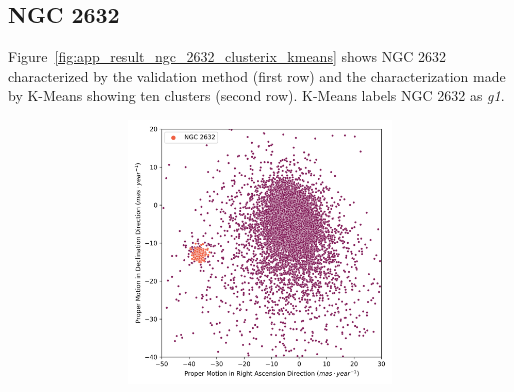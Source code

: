 \documentclass[11pt,a4paper,english,twocolumn]{article}
\begin{document}
\subsection{NGC 2632}
\label{sec:ngc2632}

Figure~\ref{fig:app_result_ngc_2632_clusterix_kmeans} shows NGC 2632 characterized
by the validation method (first row) and the characterization made by K-Means
showing ten clusters (second row). K-Means labels NGC 2632 as \emph{g1}.

\begin{figure}[htbp]
  \centering
  \begin{subfigure}{\columnwidth}
    \centering
    \begin{subfigure}[t]{0.30\textwidth}
      \centering
      \includegraphics[width=\textwidth]{../figures/ngc_2632/pm_ngc_2632.png}
    \end{subfigure}
    \hfill
    \begin{subfigure}[t]{0.30\textwidth}
      \centering

\end{subfigure}
\end{subfigure}
\end{figure}
\end{document}
